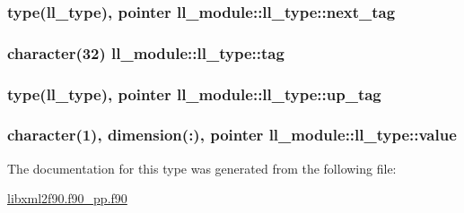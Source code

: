 \subsubsection[{next\+\_\+tag}]{\setlength{\rightskip}{0pt plus 5cm}type({\bf ll\+\_\+type}), pointer ll\+\_\+module\+::ll\+\_\+type\+::next\+\_\+tag}\label{structll__module_1_1ll__type_af5be22fa182b45e18c47d040cb88a6c0}
\hypertarget{structll__module_1_1ll__type_a984131c3c61b8fb97170e5e376c40b09}{}
\subsubsection[{tag}]{\setlength{\rightskip}{0pt plus 5cm}character(32) ll\+\_\+module\+::ll\+\_\+type\+::tag}\label{structll__module_1_1ll__type_a984131c3c61b8fb97170e5e376c40b09}
\hypertarget{structll__module_1_1ll__type_ac65372c106a08fe5f5e7bec2199c513f}{}
\subsubsection[{up\+\_\+tag}]{\setlength{\rightskip}{0pt plus 5cm}type({\bf ll\+\_\+type}), pointer ll\+\_\+module\+::ll\+\_\+type\+::up\+\_\+tag}\label{structll__module_1_1ll__type_ac65372c106a08fe5f5e7bec2199c513f}
\hypertarget{structll__module_1_1ll__type_aae295ec399655c86ef3a9cd31bf00004}{}
\subsubsection[{value}]{\setlength{\rightskip}{0pt plus 5cm}character(1), dimension(\+:), pointer ll\+\_\+module\+::ll\+\_\+type\+::value}\label{structll__module_1_1ll__type_aae295ec399655c86ef3a9cd31bf00004}


The documentation for this type was generated from the following file\+:\begin{DoxyCompactItemize}
\item 
\hyperlink{libxml2f90_8f90__pp_8f90}{libxml2f90.\+f90\+\_\+pp.\+f90}\end{DoxyCompactItemize}
